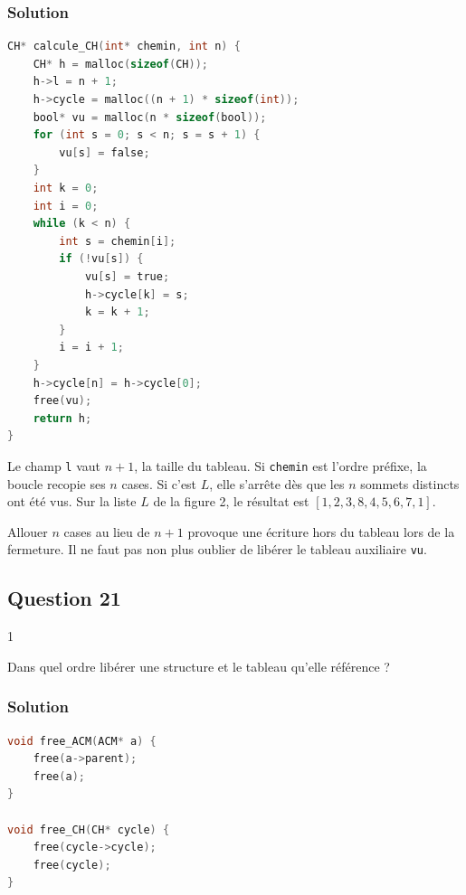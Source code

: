 \documentclass[11pt,a4paper]{article}
\begin{document}
\hypertarget{solution-19}{%
\subsubsection{Solution}\label{solution-19}}

\begin{lstlisting}[language=C]
CH* calcule_CH(int* chemin, int n) {
    CH* h = malloc(sizeof(CH));
    h->l = n + 1;
    h->cycle = malloc((n + 1) * sizeof(int));
    bool* vu = malloc(n * sizeof(bool));
    for (int s = 0; s < n; s = s + 1) {
        vu[s] = false;
    }
    int k = 0;
    int i = 0;
    while (k < n) {
        int s = chemin[i];
        if (!vu[s]) {
            vu[s] = true;
            h->cycle[k] = s;
            k = k + 1;
        }
        i = i + 1;
    }
    h->cycle[n] = h->cycle[0];
    free(vu);
    return h;
}
\end{lstlisting}

Le champ \texttt{l} vaut \(n+1\), la taille du tableau. Si \texttt{chemin} est l'ordre préfixe, la boucle recopie ses \(n\) cases. Si c'est \(L\), elle s'arrête dès que les \(n\) sommets distincts ont été vus. Sur la liste \(L\) de la figure 2, le résultat est \([1,2,3,8,4,5,6,7,1]\).

\begin{piege}

Allouer \(n\) cases au lieu de \(n+1\) provoque une écriture hors du tableau lors de la fermeture. Il ne faut pas non plus oublier de libérer le tableau auxiliaire \texttt{vu}.

\end{piege}

\hypertarget{question-21}{%
\subsection{Question 21}\label{question-21}}

\begin{indication}{1}

Dans quel ordre libérer une structure et le tableau qu'elle référence ?

\end{indication}

\hypertarget{solution-20}{%
\subsubsection{Solution}\label{solution-20}}

\begin{lstlisting}[language=C]
void free_ACM(ACM* a) {
    free(a->parent);
    free(a);
}

void free_CH(CH* cycle) {
    free(cycle->cycle);
    free(cycle);
}
\end{lstlisting}
\end{document}
